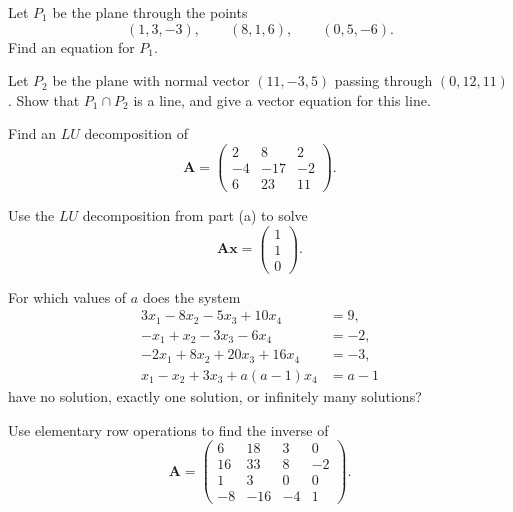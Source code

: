 \begin{problem}
\begin{problemsubparts}
\item Let $P_1$ be the plane through the points
\[
(1,3,-3),\qquad(8,1,6),\qquad(0,5,-6).
\]
Find an equation for $P_1$.
\item Let $P_2$ be the plane with normal vector $(11,-3,5)$ passing through $(0,12,11)$. Show that $P_1\cap P_2$ is a line, and give a vector equation for this line.
\end{problemsubparts}
\end{problem}

\begin{problem}
\begin{problemsubparts}
\item Find an $LU$ decomposition of
\[
\mathbf A=
\begin{pmatrix}
2&8&2\\
-4&-17&-2\\
6&23&11
\end{pmatrix}.
\]
\item Use the $LU$ decomposition from part \textup{(a)} to solve
\[
\mathbf A\mathbf x=
\begin{pmatrix}
1\\1\\0
\end{pmatrix}.
\]
\end{problemsubparts}
\end{problem}

\begin{problem}
For which values of $a$ does the system
\[
\begin{aligned}
3x_1-8x_2-5x_3+10x_4&=9,\\
-x_1+x_2-3x_3-6x_4&=-2,\\
-2x_1+8x_2+20x_3+16x_4&=-3,\\
x_1-x_2+3x_3+a(a-1)x_4&=a-1
\end{aligned}
\]
have no solution, exactly one solution, or infinitely many solutions?
\end{problem}

\begin{problem}
Use elementary row operations to find the inverse of
\[
\mathbf A=
\begin{pmatrix}
6&18&3&0\\
16&33&8&-2\\
1&3&0&0\\
-8&-16&-4&1
\end{pmatrix}.
\]
\end{problem}

